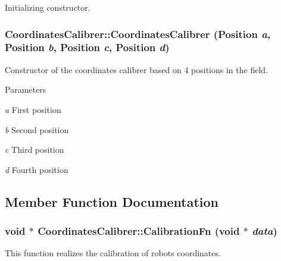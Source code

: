 Initializing constructor. 

\hypertarget{classCoordinatesCalibrer_a3b6304945fa64ac97a1b0bbc78753155}{
\subsubsection[{CoordinatesCalibrer}]{\setlength{\rightskip}{0pt plus 5cm}CoordinatesCalibrer::CoordinatesCalibrer (Position {\em a}, \/  Position {\em b}, \/  Position {\em c}, \/  Position {\em d})}}
\label{classCoordinatesCalibrer_a3b6304945fa64ac97a1b0bbc78753155}


Constructor of the coordinates calibrer based on 4 positions in the field. 


\begin{DoxyParams}{Parameters}
\item[{\em a}]First position \item[{\em b}]Second position \item[{\em c}]Third position \item[{\em d}]Fourth position \end{DoxyParams}


\subsection{Member Function Documentation}
\hypertarget{classCoordinatesCalibrer_a4ce4c153ae8c3e50faccfba40e6bc4ea}{
\subsubsection[{CalibrationFn}]{\setlength{\rightskip}{0pt plus 5cm}void $\ast$ CoordinatesCalibrer::CalibrationFn (void $\ast$ {\em data})}}
\label{classCoordinatesCalibrer_a4ce4c153ae8c3e50faccfba40e6bc4ea}


This function realizes the calibration of robots coordinates. 


